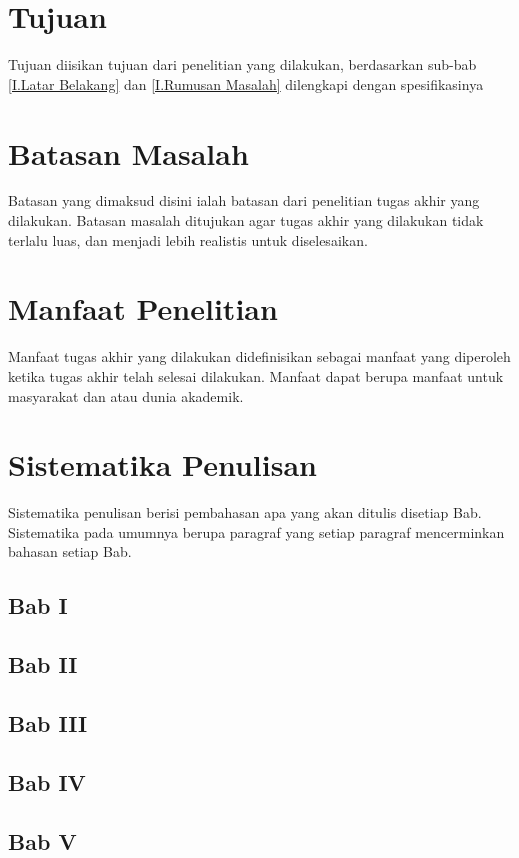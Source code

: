 \section{Tujuan} \label{I.Tujuan}
Tujuan diisikan tujuan dari penelitian yang dilakukan, berdasarkan sub-bab \ref{I.Latar Belakang} dan \ref{I.Rumusan Masalah} dilengkapi dengan spesifikasinya \par

\section{Batasan Masalah} \label{I.Batasan}
Batasan yang dimaksud disini ialah batasan dari penelitian tugas akhir yang dilakukan. Batasan masalah ditujukan agar tugas akhir yang dilakukan tidak terlalu luas, dan menjadi lebih realistis untuk diselesaikan. \par

\section{Manfaat Penelitian} \label{I.Manfaat}
Manfaat tugas akhir yang dilakukan didefinisikan sebagai manfaat yang diperoleh ketika tugas akhir telah selesai dilakukan. Manfaat dapat berupa manfaat untuk masyarakat dan atau dunia akademik. \par

\section{Sistematika Penulisan} \label{I.Sistematika}
Sistematika penulisan berisi pembahasan apa yang akan ditulis disetiap Bab. Sistematika pada umumnya berupa paragraf yang setiap paragraf mencerminkan bahasan setiap Bab. \par
\subsection{Bab I}
\subsection{Bab II}
\subsection{Bab III}
\subsection{Bab IV}
\subsection{Bab V}

